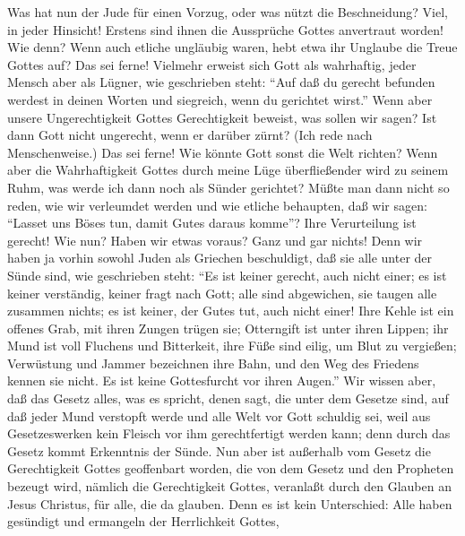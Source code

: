  Was hat nun der Jude für einen Vorzug, oder was nützt die
Beschneidung?  Viel, in jeder Hinsicht! Erstens sind ihnen
die Aussprüche Gottes anvertraut worden!  Wie denn? Wenn
auch etliche ungläubig waren, hebt etwa ihr Unglaube die Treue Gottes
auf?  Das sei ferne! Vielmehr erweist sich Gott als
wahrhaftig, jeder Mensch aber als Lügner, wie geschrieben steht: ``Auf
daß du gerecht befunden werdest in deinen Worten und siegreich, wenn du
gerichtet wirst.''  Wenn aber unsere Ungerechtigkeit
Gottes Gerechtigkeit beweist, was sollen wir sagen? Ist dann Gott nicht
ungerecht, wenn er darüber zürnt? (Ich rede nach Menschenweise.)
 Das sei ferne! Wie könnte Gott sonst die Welt richten?
 Wenn aber die Wahrhaftigkeit Gottes durch meine Lüge
überfließender wird zu seinem Ruhm, was werde ich dann noch als Sünder
gerichtet?  Müßte man dann nicht so reden, wie wir
verleumdet werden und wie etliche behaupten, daß wir sagen: ``Lasset uns
Böses tun, damit Gutes daraus komme''? Ihre Verurteilung ist gerecht!
 Wie nun? Haben wir etwas voraus? Ganz und gar nichts!
Denn wir haben ja vorhin sowohl Juden als Griechen beschuldigt, daß sie
alle unter der Sünde sind,  wie geschrieben steht: ``Es
ist keiner gerecht, auch nicht einer;  es ist keiner
verständig, keiner fragt nach Gott;  alle sind
abgewichen, sie taugen alle zusammen nichts; es ist keiner, der Gutes
tut, auch nicht einer!  Ihre Kehle ist ein offenes Grab,
mit ihren Zungen trügen sie; Otterngift ist unter ihren Lippen;
 ihr Mund ist voll Fluchens und Bitterkeit,
 ihre Füße sind eilig, um Blut zu vergießen;
 Verwüstung und Jammer bezeichnen ihre Bahn,
 und den Weg des Friedens kennen sie nicht.
 Es ist keine Gottesfurcht vor ihren Augen.''
 Wir wissen aber, daß das Gesetz alles, was es spricht,
denen sagt, die unter dem Gesetze sind, auf daß jeder Mund verstopft
werde und alle Welt vor Gott schuldig sei,  weil aus
Gesetzeswerken kein Fleisch vor ihm gerechtfertigt werden kann; denn
durch das Gesetz kommt Erkenntnis der Sünde.  Nun aber
ist außerhalb vom Gesetz die Gerechtigkeit Gottes geoffenbart worden,
die von dem Gesetz und den Propheten bezeugt wird, 
nämlich die Gerechtigkeit Gottes, veranlaßt durch den Glauben an Jesus
Christus, für alle, die da glauben.  Denn es ist kein
Unterschied: Alle haben gesündigt und ermangeln der Herrlichkeit Gottes,
